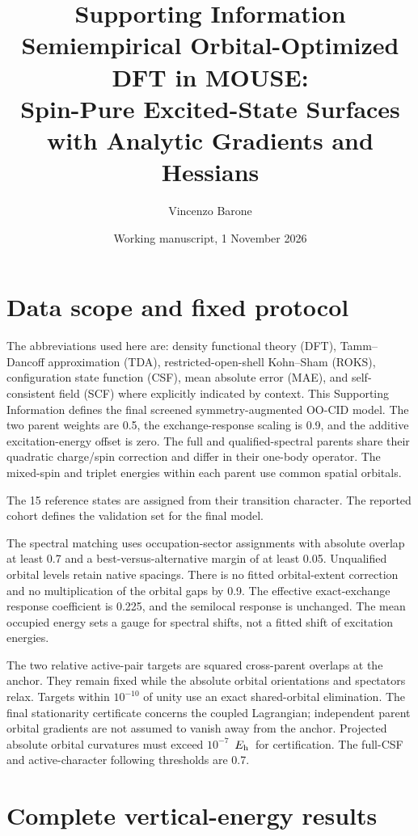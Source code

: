 \documentclass[11pt,a4paper]{article}
\title{Supporting Information\\Semiempirical Orbital-Optimized DFT in MOUSE:\\Spin-Pure Excited-State Surfaces with Analytic Gradients and Hessians}
\author{Vincenzo Barone}
\date{Working manuscript, 1 November 2026}
\newcommand{\Eh}{\ensuremath{E_{\rm h}}}
\begin{document}
\maketitle
\renewcommand{\thetable}{S\arabic{table}}
\renewcommand{\theequation}{S\arabic{equation}}
\section{Data scope and fixed protocol}
The abbreviations used here are: density functional theory (DFT),
Tamm--Dancoff approximation (TDA), restricted-open-shell Kohn--Sham (ROKS),
configuration state function (CSF), mean absolute error (MAE), and
self-consistent field (SCF) where explicitly indicated by context.
This Supporting Information defines the final screened symmetry-augmented
OO-CID model. The two parent weights are 0.5, the exchange-response scaling
is 0.9, and the additive excitation-energy offset is zero. The full and
qualified-spectral parents share their quadratic charge/spin correction and
differ in their one-body operator. The mixed-spin and triplet energies within
each parent use common spatial orbitals.

The 15 reference states are assigned from their transition character. The
reported cohort defines the validation set for the final model.

The spectral matching uses occupation-sector assignments with absolute overlap at least 0.7 and a best-versus-alternative margin of at least 0.05. Unqualified orbital levels retain native spacings. There is no fitted orbital-extent correction and no multiplication of the orbital gaps by 0.9. The effective exact-exchange response coefficient is 0.225, and the semilocal response is unchanged. The mean occupied energy sets a gauge for spectral shifts, not a fitted shift of excitation energies.

The two relative active-pair targets are squared cross-parent overlaps at the anchor. They remain fixed while the absolute orbital orientations and spectators relax. Targets within $10^{-10}$ of unity use an exact shared-orbital elimination. The final stationarity certificate concerns the coupled Lagrangian; independent parent orbital gradients are not assumed to vanish away from the anchor. Projected absolute orbital curvatures must exceed $10^{-7}$~\Eh\ for certification. The full-CSF and active-character following thresholds are 0.7.

\clearpage
\section{Complete vertical-energy results}

\end{document}
